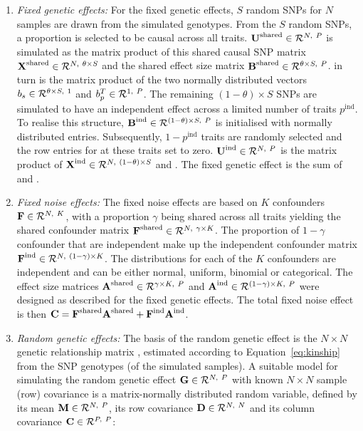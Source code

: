 \begin{enumerate}
\item \textit{Fixed genetic effects:} For the fixed genetic effects, \(S\) random SNPs for \(N\) samples are drawn from the simulated genotypes. From the \(S\) random SNPs, a proportion \tbm{\theta} is selected to be causal across all traits. \(\boldsymbol{\mathbf{U}}^\text{shared}\in \mathcal{R}^{N,~P}\) is simulated as the matrix product of this shared causal SNP matrix \(\boldsymbol{\mathbf{X}}^\text{shared}\in \mathcal{R}^{N,~\theta \times S}\) and the shared effect size matrix \(\boldsymbol{\mathbf{B}}^\text{shared} \in \mathcal{R}^{\theta  \times S,~P}\).  in turn is the matrix product of the two normally distributed vectors \(b_s \in \mathcal{R}^{\theta  \times S,~1}\) and \(b_p^T \in \mathcal{R}^{1,~P}\). The remaining \((1- \theta ) \times S\) SNPs are simulated to have an independent effect across a limited number of traits \(p^{\text{ind}}\). To realise this structure, \(\boldsymbol{\mathbf{B}}^\text{ind} \in \mathcal{R}^{(1-\theta) \times S,~P}\) is initialised with normally distributed entries. Subsequently, \(1 - p^{\text{ind}}\) traits are randomly selected and the row entries for  at these traits set to zero. \(\boldsymbol{\mathbf{U}}^\text{ind} \in \mathcal{R}^{N,~P}\) is the matrix product of \(\boldsymbol{\mathbf{X}}^\text{ind} \in \mathcal{R}^{N,~(1 - \theta)  \times S}\) and .
The fixed genetic effect  is the sum of  and .

\item \textit{Fixed noise effects:} The fixed noise effects  are based on \(K\)  confounders \(\boldsymbol{\mathbf{F}} \in \mathcal{R}^{N,~K}\), with a proportion \(\gamma\) being shared across all traits yielding the shared confounder matrix \(\boldsymbol{\mathbf{F}}^\text{shared} \in \mathcal{R}^{N,~\gamma \times K} \). The proportion of \(1- \gamma\) confounder that are independent make up the independent confounder matrix \(\boldsymbol{\mathbf{F}}^\text{ind} \in \mathcal{R}^{N,~(1-\gamma) \times K}\). The distributions for each of the \(K\)  confounders are independent and can be either normal, uniform, binomial or categorical.  The effect size matrices  \(\boldsymbol{\mathbf{A}}^\text{shared} \in \mathcal{R}^{\gamma \times K,~P}\)  and \(\boldsymbol{\mathbf{A}}^\text{ind}  \in \mathcal{R}^{(1-\gamma) \times K,~P} \) were designed as described for the fixed genetic effects. The total fixed noise effect is then \(\boldsymbol{\mathbf{C}} =  \boldsymbol{\mathbf{F}}^\text{shared} \boldsymbol{\mathbf{A}}^\text{shared} + \boldsymbol{\mathbf{F}}^\text{ind}  \boldsymbol{\mathbf{A}}^\text{ind} \).

\item \textit{Random genetic effects:} The basis of the random genetic effect is the \(N \times N\) genetic relationship matrix , estimated according to Equation~\ref{eq:kinship} from the SNP genotypes (of the simulated samples). A suitable model for simulating the random genetic effect \(\boldsymbol{\mathbf{G}} \in \mathcal{R}^{N,~P}\) with known \(N \times N\) sample (row) covariance is a matrix-normally distributed random variable, defined by its mean \(\boldsymbol{\mathbf{M}} \in \mathcal{R}^{N,~P}\), its row covariance \(\boldsymbol{\mathbf{D}} \in \mathcal{R}^{N,~N}\) and its column covariance \(\boldsymbol{\mathbf{C}} \in \mathcal{R}^{P,~P}\): 


\end{enumerate}
